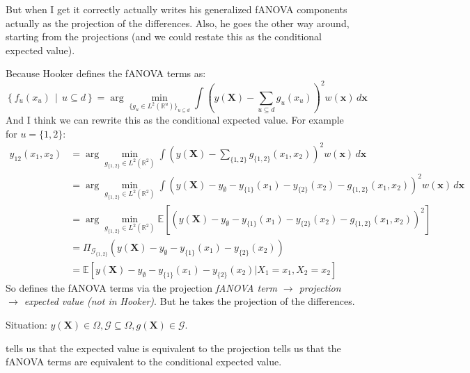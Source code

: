 But when I get it correctly \cite{hooker2007} actually writes his generalized fANOVA components actually as the projection of the differences. Also, he goes the other way around, starting from the projections (and we could restate this as the conditional expected value).

Because Hooker defines the fANOVA terms as:
\begin{equation}
\left\{ f_u(x_u) \,\middle|\, u \subseteq d \right\}
= \arg\min_{\{g_u \in L^2(\mathbb{R}^u)\}_{u \subseteq d}} 
\int \left( y(\boldsymbol{X}) - \sum_{u \subseteq d} g_u(x_u) \right)^2 w(\boldsymbol{x}) \, d\boldsymbol{x}
\label{eq:fanova_decomposition_generalized}
\end{equation}
And I think we can rewrite this as the conditional expected value. For example for $u = \{1,2\}$:
\begin{align*}
    y_{12}(x_1, x_2) &= \arg \min_{g_{\{1,2\}} \in L^2(\mathbb{R}^2)} \int \left( y(\boldsymbol{X}) - \sum_{\{1,2\}} g_{\{1,2\}}(x_1, x_2) \right)^2 w(\boldsymbol{x}) \, d\boldsymbol{x} \\
    &= \arg \min_{g_{\{1,2\}} \in L^2(\mathbb{R}^2)} \int \left( y(\boldsymbol{X}) - y_\emptyset - y_{\{1\}}(x_1) - y_{\{2\}}(x_2) - g_{\{1,2\}}(x_1, x_2) \right)^2 w(\boldsymbol{x}) \, d\boldsymbol{x} \\
    &= \arg \min_{g_{\{1,2\}} \in L^2(\mathbb{R}^2)} \mathbb{E}[(y(\boldsymbol{X}) - y_\emptyset - y_{\{1\}}(x_1) - y_{\{2\}}(x_2) - g_{\{1,2\}}(x_1, x_2))^2] \\
    &= \Pi_{\mathcal{G}_{\{1,2\}}}(y(\boldsymbol{X}) - y_\emptyset - y_{\{1\}}(x_1) - y_{\{2\}}(x_2)) \\
    &= \mathbb{E}[y(\boldsymbol{X}) - y_{\emptyset} - y_{\{1\}}(x_1) - y_{\{2\}}(x_2) | X_1 = x_1, X_2 = x_2]
\end{align*}
So \cite{hooker2007} defines the fANOVA terms via the projection \textit{fANOVA term $\rightarrow$ projection $\rightarrow$ expected value (not in Hooker)}. But he takes the projection of the differences. 

Situation: $y(\boldsymbol{X}) \in \Omega, \mathcal{G} \subseteq \Omega, g(\boldsymbol{X}) \in \mathcal{G}$.\par
\cite{Vaart_1998} tells us that the expected value is equivalent to the projection \cite{muehlenstaedt2012} tells us that the fANOVA terms are equivalent to the conditional expected value.\par






